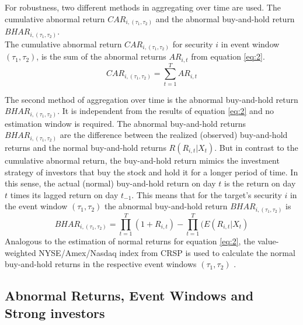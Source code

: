 \documentclass[12pt]{article}
\begin{document}
For robustness, two different methods in aggregating over time are used. The cumulative abnormal return $CAR_{i,(\tau_1,\tau_2)}$ and the abnormal buy-and-hold return $BHAR_{i,(\tau_1,\tau_2)}$.\\
The cumulative abnormal return $CAR_{i,(\tau_1,\tau_2)}$ for security $i$ in event window $(\tau_1,\tau_2)$, is the sum of the abnormal returns $AR_{i,t}$ from equation \eqref{eq:2}.
	\begin{equation}
		CAR_{i,(\tau_1,\tau_2)}=\sum_{t=1}^{T}AR_{i,t}
	\end{equation}
\pagebreak

The second method of aggregation over time is the abnormal buy-and-hold return $BHAR_{i,(\tau_1,\tau_2)}$. It is independent from the results of equation \eqref{eq:2} and no estimation window is required. 
The abnormal buy-and-hold returns $BHAR_{i,(\tau_1,\tau_2)}$ are the difference between the realized (observed) buy-and-hold returns and the normal buy-and-hold returns $R(R_{i,t}|X_{t})$.
But in contrast to the cumulative abnormal return, the buy-and-hold return mimics the investment strategy of investors that buy the stock and hold it for a longer period of time. In this sense, the actual (normal) buy-and-hold return on day $t$ is the return on day $t$ times its lagged return on day $t_{-1}$. This means that for the target's security $i$ in the event window $(\tau_1,\tau_2)$ the abnormal buy-and-hold return $BHAR_{i,(\tau_1,\tau_2)}$ is
\begin{equation}
	BHAR_{i,(\tau_1,\tau_2)}=\prod_{t=1}^{T}(1+R_{i,t})-\prod_{t=1}^{T}(E(R_{i,t}|X_{t})
\end{equation}
Analogous to the estimation of normal returns for equation \eqref{eq:2}, the value-weighted NYSE/Amex/Nasdaq index from CRSP is used to calculate the normal buy-and-hold returns in the respective event windows $(\tau_1,\tau_2)$ \citep[p.25]{Brav2009}.

\subsection{Abnormal Returns, Event Windows and Strong investors}
\end{document}

